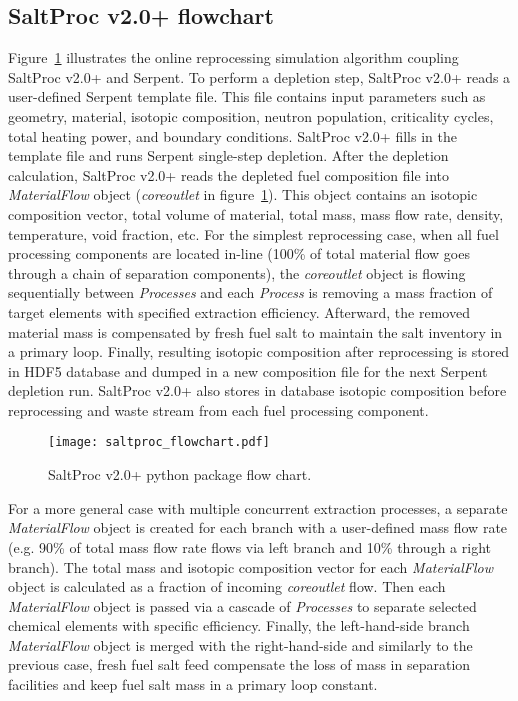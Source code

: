 \subsection{SaltProc v2.0+ flowchart}
Figure~\ref{fig:saltproc_flow} illustrates the online reprocessing simulation 
algorithm coupling SaltProc v2.0+ and Serpent. To perform a depletion step, 
SaltProc v2.0+ reads a user-defined Serpent template file. This file contains 
input 
parameters such as geometry, material, isotopic composition, neutron 
population, criticality cycles, total heating power, and boundary conditions. 
SaltProc v2.0+ fills in the template file and runs Serpent single-step 
depletion. 
After the depletion calculation, SaltProc v2.0+ reads the depleted fuel 
composition 
file into \textit{MaterialFlow} object (\textit{core\textunderscore outlet} in 
figure~\ref{fig:saltproc_flow}). This object contains an isotopic composition 
vector, total volume of material, total mass, mass flow rate, density, 
temperature, 
void fraction, etc. For the simplest reprocessing case, when all fuel 
processing components are located in-line 
(100\% of total material flow goes through 
a chain of separation components), the \textit{core\textunderscore outlet} 
object is flowing 
sequentially between \textit{Processes} and each \textit{Process} is 
removing a mass fraction of target elements with specified extraction 
efficiency. Afterward, the removed material mass is compensated by 
fresh fuel salt to maintain the salt inventory in a primary loop. 
Finally, resulting isotopic composition after reprocessing is stored in 
HDF5 database and dumped in a new composition file for the next 
Serpent depletion run. SaltProc v2.0+ also stores in database isotopic 
composition 
before reprocessing and waste stream from each fuel processing component. 
\begin{figure}[ht!] %
	\centering
	\texttt{[image: saltproc\_flowchart.pdf]}
	\vspace{-0.35in}
	\caption{SaltProc v2.0+ python package flow chart.}
	\label{fig:saltproc_flow}
\end{figure}

For a more general case with multiple concurrent extraction processes, a 
separate 
\textit{MaterialFlow} object is created for each branch with a user-defined 
mass flow rate (e.g. 90\% of total mass flow rate flows via left branch and 
10\% through a right branch). The total mass and isotopic composition vector 
for each \textit{MaterialFlow} object is calculated as a fraction of incoming 
\textit{core\textunderscore outlet} flow. Then each \textit{MaterialFlow} 
object is 
passed via a cascade of \textit{Processes} to separate selected chemical 
elements with 
specific efficiency. Finally, the left-hand-side branch \textit{MaterialFlow} 
object is
merged with the right-hand-side and similarly to the previous case, fresh 
fuel salt feed compensate the loss of mass in separation facilities and keep 
fuel salt mass in a primary loop constant.

